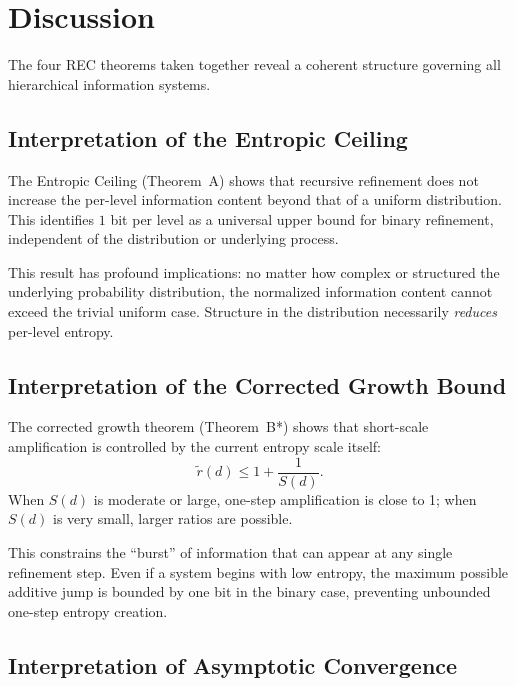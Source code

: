 \documentclass[11pt,a4paper]{article}
\theoremstyle{definition}
\theoremstyle{remark}
\newcommand{\rtilde}{\tilde{r}}
\begin{document}
\section{Discussion}
\label{sec:discussion}

The four REC theorems taken together reveal a coherent structure governing
all hierarchical information systems. 

\subsection{Interpretation of the Entropic Ceiling}

The Entropic Ceiling (Theorem~A)
shows that recursive refinement does not increase the per-level information
content beyond that of a uniform distribution. This identifies $1$ bit per 
level as a universal upper bound for binary refinement, independent of the 
distribution or underlying process.

This result has profound implications: no matter how complex or structured
the underlying probability distribution, the normalized information content
cannot exceed the trivial uniform case. Structure in the distribution 
necessarily \emph{reduces} per-level entropy.

\subsection{Interpretation of the Corrected Growth Bound}

The corrected growth theorem (Theorem~B*) shows that short-scale amplification
is controlled by the current entropy scale itself:
\[
\rtilde(d)\le 1+\frac{1}{S(d)}.
\]
When $S(d)$ is moderate or large, one-step amplification is close to 1; when
$S(d)$ is very small, larger ratios are possible.

This constrains the ``burst'' of information that can appear at any single
refinement step. Even if a system begins with low entropy, the maximum 
possible additive jump is bounded by one bit in the binary case, preventing
unbounded one-step entropy creation.

\subsection{Interpretation of Asymptotic Convergence}
\end{document}
